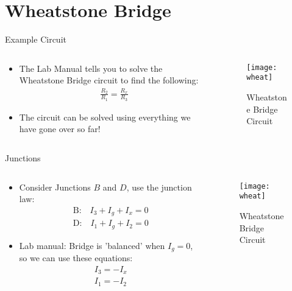 \documentclass{beamer}
\theoremstyle{remark}
\begin{document}
\section{Wheatstone Bridge}
\begin{frame}{Example Circuit}
  \begin{columns}
    \begin{column}{0.6\textwidth}
      \begin{itemize}
      \item The Lab Manual tells you to solve the Wheatstone Bridge circuit to find the following:
        \begin{align*}
          \frac{R_2}{R_1}=\frac{R_x}{R_3}
        \end{align*}
      \item The circuit can be solved using everything we have gone over so far!
      \end{itemize}
    \end{column}
    \begin{column}{0.4\textwidth}
      \begin{figure}[H]
        \centering
        \texttt{[image: wheat]}
        \caption{Wheatstone Bridge Circuit}
      \end{figure}
    \end{column}
  \end{columns}
\end{frame}

\begin{frame}{Junctions}
  \begin{columns}
    \begin{column}{0.6\textwidth}
      \begin{itemize}
      \item Consider Junctions $B$ and $D$, use the junction law:
        \begin{align*}
          \text{B:}\quad I_3+I_g+I_x=0\\
          \text{D:}\quad I_1+I_g+I_2=0
        \end{align*}
      \item Lab manual: Bridge is 'balanced' when $I_g=0$, so we can use these equations:
        \begin{align*}
          I_3=-I_x\\
          I_1=-I_2
        \end{align*}
      \end{itemize}
    \end{column}
    \begin{column}{0.4\textwidth}
      \begin{figure}[H]
        \centering
        \texttt{[image: wheat]}
        \caption{Wheatstone Bridge Circuit}
      \end{figure}
    \end{column}
  \end{columns}
\end{frame}
\end{document}
